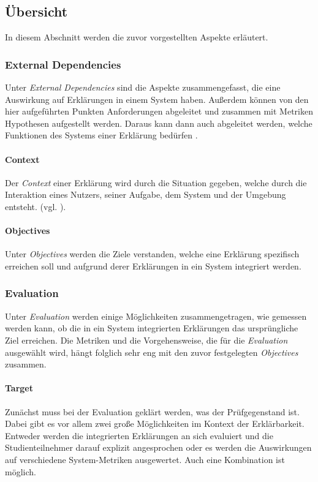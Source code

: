 \subsection{Übersicht}

In diesem Abschnitt werden die zuvor vorgestellten Aspekte erläutert.

\subsubsection{External Dependencies}

Unter \textit{External Dependencies} sind die Aspekte zusammengefasst, die eine Auswirkung auf Erklärungen in einem System haben. Außerdem können von den hier aufgeführten Punkten Anforderungen abgeleitet und zusammen mit Metriken Hypothesen aufgestellt werden. Daraus kann dann auch abgeleitet werden, welche Funktionen des Systems einer Erklärung bedürfen \cite{kohl_explainability_2019}.

\paragraph{Context} Der \textit{Context} einer Erklärung wird durch die Situation gegeben, welche durch die Interaktion eines Nutzers, seiner Aufgabe, dem System und der Umgebung entsteht. (vgl. \cite{chazette_knowledge_nodate, kohl_explainability_2019}).

\paragraph{Objectives} Unter \textit{Objectives} werden die Ziele verstanden, welche eine Erklärung spezifisch erreichen soll und aufgrund derer Erklärungen in ein System integriert werden.

\subsubsection{Evaluation}

Unter \textit{Evaluation} werden einige Möglichkeiten zusammengetragen, wie gemessen werden kann, ob die in ein System integrierten Erklärungen das ursprüngliche Ziel erreichen. Die Metriken und die Vorgehensweise, die für die \textit{Evaluation} ausgewählt wird, hängt folglich sehr eng mit den zuvor festgelegten \textit{Objectives} zusammen.

\paragraph{Target} Zunächst muss bei der Evaluation geklärt werden, was der Prüfgegenstand ist. Dabei gibt es vor allem zwei große Möglichkeiten im Kontext der Erklärbarkeit. Entweder werden die integrierten Erklärungen an sich evaluiert und die Studienteilnehmer darauf explizit angesprochen oder es werden die Auswirkungen auf verschiedene System-Metriken ausgewertet. Auch eine Kombination ist möglich.

